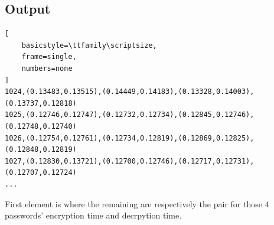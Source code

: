 \documentclass[12pt,a4paper]{article}
\begin{document}
\subsection{Output}

\begin{lstlisting}[
    basicstyle=\ttfamily\scriptsize, 
    frame=single,
    numbers=none
]
1024,(0.13483,0.13515),(0.14449,0.14183),(0.13328,0.14003),(0.13737,0.12818)
1025,(0.12746,0.12747),(0.12732,0.12734),(0.12845,0.12746),(0.12748,0.12740)
1026,(0.12754,0.12761),(0.12734,0.12819),(0.12869,0.12825),(0.12848,0.12819)
1027,(0.12830,0.13721),(0.12700,0.12746),(0.12717,0.12731),(0.12707,0.12724)
...
\end{lstlisting}

First element is  where the remaining are respectively the pair for those $4$ passwords' encryption time and decrpytion time.
\end{document}
